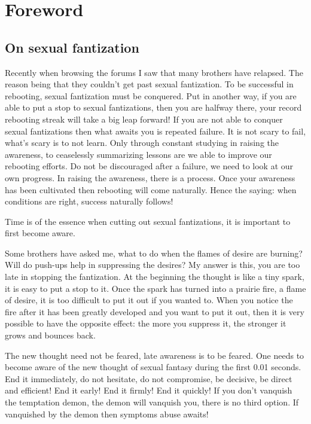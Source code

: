 \documentclass[
]{book}
\begin{document}
\hypertarget{foreword-7}{%
\section{Foreword}\label{foreword-7}}

\hypertarget{on-sexual-fantization}{%
\subsection{On sexual fantization}\label{on-sexual-fantization}}

Recently when browsing the forums I saw that many brothers have relapsed. The reason being that they couldn't get past sexual fantization. To be successful in rebooting, sexual fantization must be conquered. Put in another way, if you are able to put a stop to sexual fantizations, then you are halfway there, your record rebooting streak will take a big leap forward! If you are not able to conquer sexual fantizations then what awaits you is repeated failure. It is not scary to fail, what's scary is to not learn. Only through constant studying in raising the awareness, to ceaselessly summarizing lessons are we able to improve our rebooting efforts. Do not be discouraged after a failure, we need to look at our own progress. In raising the awareness, there is a process. Once your awareness has been cultivated then rebooting will come naturally. Hence the saying: when conditions are right, success naturally follows!

Time is of the essence when cutting out sexual fantizations, it is important to first become aware.

Some brothers have asked me, what to do when the flames of desire are burning? Will do push-ups help in suppressing the desires? My answer is this, you are too late in stopping the fantization. At the beginning the thought is like a tiny spark, it is easy to put a stop to it. Once the spark has turned into a prairie fire, a flame of desire, it is too difficult to put it out if you wanted to. When you notice the fire after it has been greatly developed and you want to put it out, then it is very possible to have the opposite effect: the more you suppress it, the stronger it grows and bounces back.

The new thought need not be feared, late awareness is to be feared. One needs to become aware of the new thought of sexual fantasy during the first 0.01 seconds. End it immediately, do not hesitate, do not compromise, be decisive, be direct and efficient! End it early! End it firmly! End it quickly! If you don't vanquish the temptation demon, the demon will vanquish you, there is no third option. If vanquished by the demon then symptoms abuse awaits!
\end{document}
